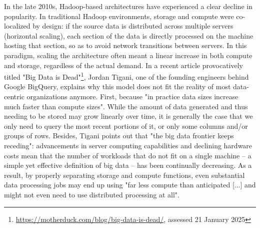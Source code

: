 \documentclass[graybox]{svmult}
\begin{document}
In the late 2010s, Hadoop-based architectures have experienced a clear decline in popularity. In traditional Hadoop environments, storage and compute were co-localized by design: if the source data is distributed across multiple servers (horizontal scaling), each section of the data is directly processed on the machine hosting that section, so as to avoid network transitions between servers. In this paradigm, scaling the architecture often meant a linear increase in both compute and storage, regardless of the actual demand. In a recent article provocatively titled "Big Data is Dead"\footnote{\url{https://motherduck.com/blog/big-data-is-dead/}, assessed 21 January 2025}, Jordan Tigani, one of the founding engineers behind Google BigQuery, explains why this model does not fit the reality of most data-centric organizations anymore. First, because "in practice data sizes increase much faster than compute sizes". While the amount of data generated and thus needing to be stored may grow linearly over time, it is generally the case that we only need to query the most recent portions of it, or only some columns and/or groups of rows. Besides, Tigani points out that "the big data frontier keeps receding": advancements in server computing capabilities and declining hardware costs mean that the number of workloads that do not fit on a single machine -- a simple yet effective definition of big data -- has been continually decreasing. As a result, by properly separating storage and compute functions, even substantial data processing jobs may end up using "far less compute than anticipated [...] and might not even need to use distributed processing at all".
\end{document}

